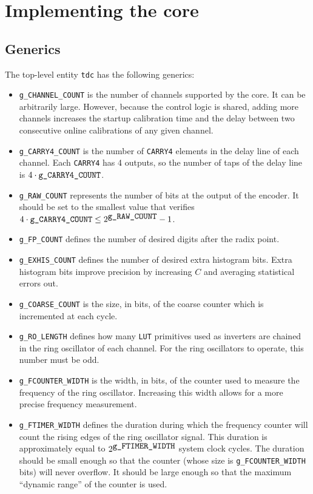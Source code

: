 \documentclass[a4paper,11pt]{article}
\begin{document}
\section{Implementing the core}
\subsection{Generics}
\label{topgenerics}
The top-level entity \verb!tdc! has the following generics:
\begin{itemize}
\item \verb!g_CHANNEL_COUNT! is the number of channels supported by the core. It can be arbitrarily large. However, because the control logic is shared, adding more channels increases the startup calibration time and the delay between two consecutive online calibrations of any given channel.
\item \verb!g_CARRY4_COUNT! is the number of \verb!CARRY4! elements in the delay line of each channel. Each \verb!CARRY4! has 4 outputs, so the number of taps of the delay line is $4 \cdot \verb!g_CARRY4_COUNT!$.
\item \verb!g_RAW_COUNT! represents the number of bits at the output of the encoder. It should be set to the smallest value that verifies $4\cdot \verb!g_CARRY4_COUNT! \le 2^{\verb!g_RAW_COUNT!}-1$.
\item \verb!g_FP_COUNT! defines the number of desired digits after the radix point.
\item \verb!g_EXHIS_COUNT! defines the number of desired extra histogram bits. Extra histogram bits improve precision by increasing $C$ and averaging statistical errors out.
\item \verb!g_COARSE_COUNT! is the size, in bits, of the coarse counter which is incremented at each cycle.
\item \verb!g_RO_LENGTH! defines how many \verb!LUT! primitives used as inverters are chained in the ring oscillator of each channel. For the ring oscillators to operate, this number must be odd.
\item \verb!g_FCOUNTER_WIDTH! is the width, in bits, of the counter used to measure the frequency of the ring oscillator. Increasing this width allows for a more precise frequency measurement.
\item \verb!g_FTIMER_WIDTH! defines the duration during which the frequency counter will count the rising edges of the ring oscillator signal. This duration is approximately equal to $2^{\verb!g_FTIMER_WIDTH!}$ system clock cycles. The duration should be small enough so that the counter (whose size is \verb!g_FCOUNTER_WIDTH! bits) will never overflow. It should be large enough so that the maximum ``dynamic range'' of the counter is used.
\end{itemize}
\end{document}
